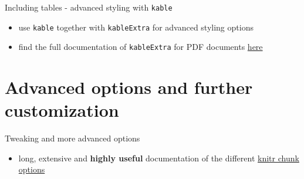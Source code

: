 \documentclass[
  10pt,
  ignorenonframetext,
]{beamer}
\providecommand{\tightlist}{%
  \setlength{\itemsep}{0pt}\setlength{\parskip}{0pt}}
\begin{document}
\begin{frame}[fragile]{Including tables - advanced styling with
\texttt{kable}}
\protect\hypertarget{including-tables---advanced-styling-with-kable}{}
\begin{itemize}[<+->]
\tightlist
\item
  use \texttt{kable} together with \texttt{kableExtra} for advanced
  styling options
\end{itemize}

\pause

\begin{table}[!h]

\caption{\label{tab:kable-advanced}Differences in Flipper and Bill Length across Penguin Species}
\centering
{}
\end{table}

\pause

\begin{itemize}[<+->]
\tightlist
\item
  find the full documentation of \texttt{kableExtra} for PDF documents
  \href{http://haozhu233.github.io/kableExtra/awesome_table_in_pdf.pdf}{here}
\end{itemize}
\end{frame}

\hypertarget{advanced-options-and-further-customization}{%
\section{Advanced options and further
customization}\label{advanced-options-and-further-customization}}

\begin{frame}{Tweaking and more advanced options}
\protect\hypertarget{tweaking-and-more-advanced-options}{}
\begin{itemize}[<+->]
\tightlist
\item
  long, extensive and \textbf{highly useful} documentation of the
  different \href{https://yihui.org/knitr/options/}{knitr chunk options}
\end{itemize}
\end{frame}
\end{document}
